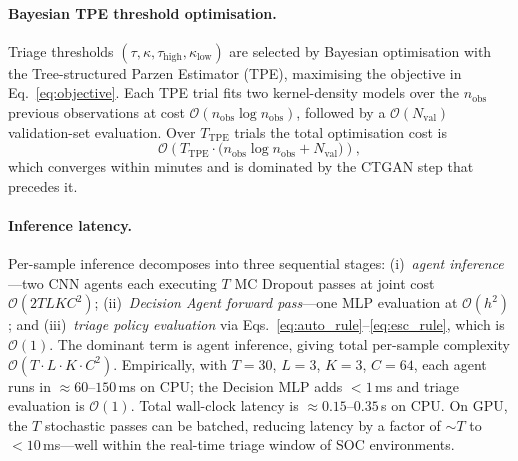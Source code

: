 \documentclass[3p]{elsarticle}
\begin{document}
\begin{changedblock}
\paragraph{Bayesian TPE threshold optimisation.}
Triage thresholds $(\tau, \kappa, \tau_{\mathrm{high}}, \kappa_{\mathrm{low}})$ are
selected by Bayesian optimisation with the Tree-structured Parzen Estimator (TPE),
maximising the objective in Eq.~\eqref{eq:objective}.
Each TPE trial fits two kernel-density models over the $n_{\mathrm{obs}}$ previous
observations at cost $\mathcal{O}(n_{\mathrm{obs}} \log n_{\mathrm{obs}})$, followed
by a $\mathcal{O}(N_{\mathrm{val}})$ validation-set evaluation.
Over $T_{\mathrm{TPE}}$ trials the total optimisation cost is
\begin{equation}
  \mathcal{O}\!\left(T_{\mathrm{TPE}} \cdot
  \bigl(n_{\mathrm{obs}} \log n_{\mathrm{obs}} + N_{\mathrm{val}}\bigr)\right),
  \label{eq:tpe_complexity}
\end{equation}
which converges within minutes and is dominated by the CTGAN step that precedes it.

\paragraph{Inference latency.}
Per-sample inference decomposes into three sequential stages:
(i)~\emph{agent inference}---two CNN agents each executing $T$ MC Dropout passes at joint
cost $\mathcal{O}(2 T L K C^2)$;
(ii)~\emph{Decision Agent forward pass}---one MLP evaluation at $\mathcal{O}(h^2)$; and
(iii)~\emph{triage policy evaluation} via Eqs.~\eqref{eq:auto_rule}--\eqref{eq:esc_rule},
which is $\mathcal{O}(1)$.
The dominant term is agent inference, giving total per-sample complexity
$\mathcal{O}(T \cdot L \cdot K \cdot C^2)$.
Empirically, with $T=30$, $L=3$, $K=3$, $C=64$, each agent runs in $\approx 60$--$150$\,ms on
CPU; the Decision MLP adds $<1$\,ms and triage evaluation is $\mathcal{O}(1)$.
Total wall-clock latency is $\approx 0.15$--$0.35$\,s on CPU.
On GPU, the $T$ stochastic passes can be batched, reducing latency by a factor of $\sim T$
to $<10$\,ms---well within the real-time triage window of SOC environments.


\end{changedblock}
\end{document}
